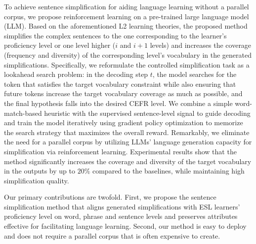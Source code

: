 To achieve sentence simplification for aiding language learning without a parallel corpus, we propose reinforcement learning on a pre-trained large language model (LLM). 
Based on the aforementioned L2 learning theories, the proposed method simplifies the complex sentences to the one corresponding to the learner's proficiency level or one level higher ($i$ and $i+1$ levels) and increases the coverage (frequency and diversity) of the corresponding level’s vocabulary in the generated simplifications. 
Specifically, we reformulate the controlled simplification task as a lookahead search problem: in the decoding step $t$, the model searches for the token that satisfies the target vocabulary constraint while also ensuring that future tokens 
increase the target vocabulary coverage as much as possible, and the final hypothesis falls into the desired CEFR level. 
We combine a simple word-match-based heuristic with the supervised sentence-level signal to guide decoding and train the model iteratively using gradient policy optimization to memorize the search strategy that maximizes the overall reward. 
Remarkably, we eliminate the need for a parallel corpus by utilizing LLMs' language generation capacity for simplification via reinforcement learning. 
Experimental results show that the method significantly increases the coverage and diversity of the target vocabulary in the outputs by up to $20\%$ compared to the baselines, while maintaining high simplification quality.

Our primary contributions are twofold. 
First, we propose the sentence simplification method that aligns generated simplifications with ESL learners’ proficiency level on word, phrase and sentence levels and preserves attributes effective for facilitating language learning. 
Second, our method is easy to deploy and does not require a parallel corpus that is often expensive to create. 

